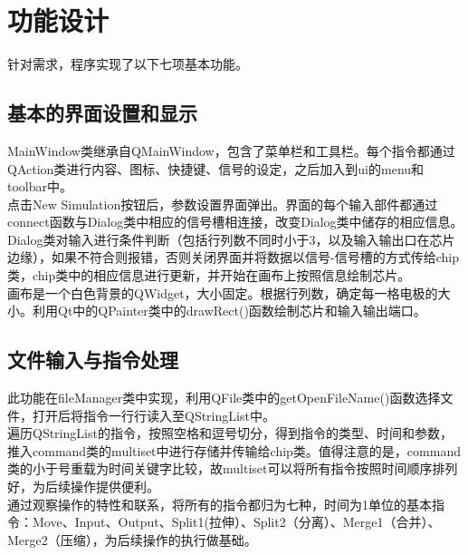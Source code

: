 \documentclass[12pt, a4paper]{article}
\begin{document}
		\section{功能设计}
		针对需求，程序实现了以下七项基本功能。
		\subsection{基本的界面设置和显示}
			MainWindow类继承自QMainWindow，包含了菜单栏和工具栏。每个指令都通过QAction类进行内容、图标、快捷键、信号的设定，之后加入到ui的menu和toolbar中。 \\ \hspace*{0.8cm}
			点击New Simulation按钮后，参数设置界面弹出。界面的每个输入部件都通过connect函数与Dialog类中相应的信号槽相连接，改变Dialog类中储存的相应信息。\\ \hspace*{0.8cm}
			Dialog类对输入进行条件判断（包括行列数不同时小于3，以及输入输出口在芯片边缘），如果不符合则报错，否则关闭界面并将数据以信号-信号槽的方式传给chip类，chip类中的相应信息进行更新，并开始在画布上按照信息绘制芯片。 \\ \hspace*{0.8cm}
			画布是一个白色背景的QWidget，大小固定。根据行列数，确定每一格电极的大小。利用Qt中的QPainter类中的drawRect()函数绘制芯片和输入输出端口。
			
		\subsection{文件输入与指令处理}
			此功能在fileManager类中实现，利用QFile类中的getOpenFileName()函数选择文件，打开后将指令一行行读入至QStringList中。 \\ \hspace*{0.8cm}
			遍历QStringList的指令，按照空格和逗号切分，得到指令的类型、时间和参数，推入command类的multiset中进行存储并传输给chip类。值得注意的是，command类的小于号重载为时间关键字比较，故multiset可以将所有指令按照时间顺序排列好，为后续操作提供便利。 \\ \hspace*{0.8cm}
			通过观察操作的特性和联系，将所有的指令都归为七种，时间为1单位的基本指令：Move、Input、Output、Split1(拉伸）、Split2（分离）、Merge1（合并）、Merge2（压缩），为后续操作的执行做基础。
			
\end{document}
